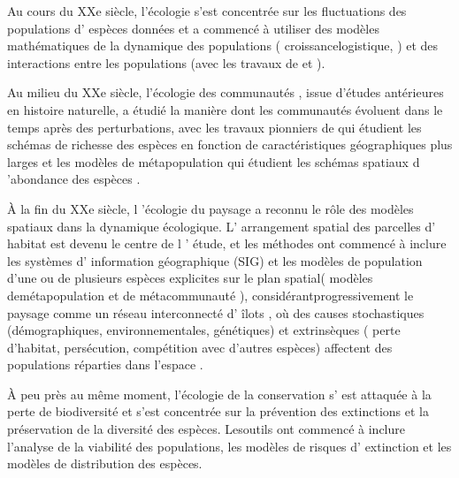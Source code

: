 \begin{displayquote}
\begin{displayquote}
\begin{displayquote}
{{{\begin{tcolorbox}
Au cours du XXe siècle, l'écologie s'est concentrée sur les fluctuations des populations d' espèces données et a commencé à utiliser des modèles mathématiques de la dynamique des populations ( croissancelogistique, \cite{verhulst_1838}) et des interactions entre les populations (avec les travaux de \cite{alfred_jlotka_elements_1925} et \cite{volterra_fluctuations_1926}). 



  Au milieu du XXe siècle, l'écologie des communautés , issue d'études antérieures en histoire naturelle, a étudié la manière dont les communautés évoluent dans le temps après des perturbations, avec les travaux pionniers de \cite{macarthur_theory_1967} qui étudient les schémas de richesse des espèces en fonction de caractéristiques géographiques plus larges et les modèles de métapopulation qui étudient les schémas spatiaux d 'abondance des espèces \citep{levins_demographic_1969, roughgarden_population_1974}.



À la fin du XXe siècle, l 'écologie du paysage a reconnu le rôle des modèles spatiaux dans la dynamique écologique. L' arrangement spatial des parcelles d' habitat est devenu le centre de l ' étude, et les méthodes ont commencé à inclure les systèmes d' information géographique (SIG) et les modèles de population d'une ou de plusieurs espèces explicites sur le plan spatial( modèles demétapopulation et de métacommunauté ),   considérantprogressivement le paysage comme un réseau interconnecté d' îlots \citep{hanski_metapopulation_1998, urban_landscape_2001}, où des causes stochastiques (démographiques, environnementales, génétiques) et extrinsèques ( perte d'habitat, persécution, compétition avec d'autres espèces) affectent des populations réparties dans l'espace \citep{hanski_metapopulation_1998}.



À peu près au même moment, l'écologie de la conservation \citep{soule_conservation_1986} s' est attaquée à la perte de biodiversité et s'est concentrée sur la prévention des extinctions et la préservation de la diversité des espèces.   Lesoutils ont commencé à inclure l'analyse de la viabilité des populations, les modèles de risques d' extinction et les modèles de distribution des espèces. 

\end{tcolorbox}


\clearpage
{}
{}
}}}
\end{displayquote}
\end{displayquote}
\end{displayquote}
